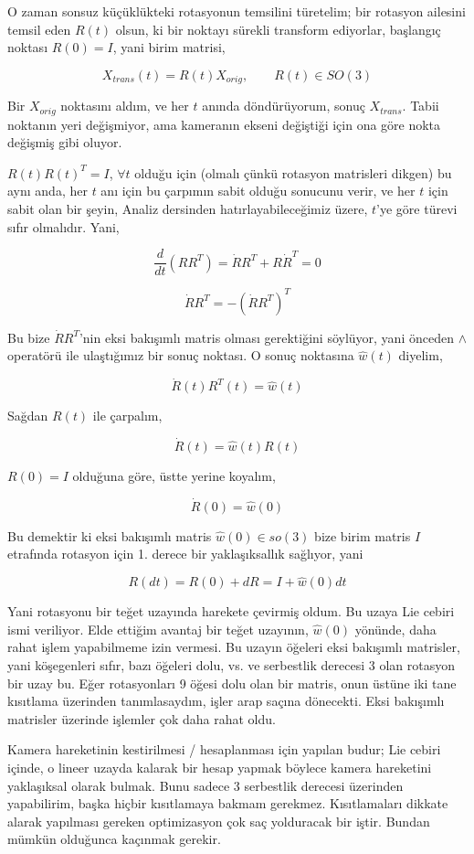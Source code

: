 \documentclass[12pt,fleqn]{article}\usepackage{../../common}
\begin{document}
O zaman sonsuz küçüklükteki rotasyonun temsilini türetelim; bir rotasyon
ailesini temsil eden $R(t)$ olsun, ki bir noktayı sürekli transform
ediyorlar, başlangıç noktası $R(0) = I$, yani birim matrisi,

$$ X_{trans}(t) = R(t) X_{orig}, \qquad R(t) \in SO(3) $$

Bir $X_{orig}$ noktasını aldım, ve her $t$ anında döndürüyorum, sonuç
$X_{trans}$. Tabii noktanın yeri değişmiyor, ama kameranın ekseni değiştiği
için ona göre nokta değişmiş gibi oluyor. 

$R(t)R(t)^T = I$, $\forall t$ olduğu için (olmalı çünkü rotasyon matrisleri
dikgen) bu aynı anda, her $t$ anı için bu çarpımın sabit olduğu sonucunu
verir, ve her $t$ için sabit olan bir şeyin, Analiz dersinden
hatırlayabileceğimiz üzere, $t$'ye göre türevi sıfır olmalıdır. Yani,

$$ \frac{d}{dt} (RR^T) = \dot{R}R^T + R \dot{R}^T = 0 $$

$$  \dot{R}R^T = - (\dot{R}R^T)^T  $$

Bu bize $\dot{R}R^T$'nin eksi bakışımlı matris olması gerektiğini söylüyor,
yani önceden $\land$ operatörü ile ulaştığımız bir sonuç noktası. O sonuç
noktasına $\hat{w}(t)$ diyelim,

$$\dot{R}(t)R^T(t) = \hat{w}(t)$$

Sağdan $R(t)$ ile çarpalım, 

$$\dot{R}(t) = \hat{w}(t)R(t)$$

$R(0)=I$ olduğuna göre, üstte yerine koyalım, 

$$\dot{R}(0) = \hat{w}(0)  $$

Bu demektir ki eksi bakışımlı matris $ \hat{w}(0) \in so(3)$ bize birim
matris $I$ etrafında rotasyon için 1. derece bir yaklaşıksallık sağlıyor,
yani 

$$ R(dt) = R(0) + dR = I +  \hat{w}(0) dt $$

Yani rotasyonu bir teğet uzayında harekete çevirmiş oldum. Bu uzaya Lie
cebiri ismi veriliyor. Elde ettiğim avantaj bir teğet uzayının,
$\hat{w}(0)$ yönünde, daha rahat işlem yapabilmeme izin vermesi. Bu uzayın
öğeleri eksi bakışımlı matrisler, yani köşegenleri sıfır, bazı öğeleri
dolu, vs. ve serbestlik derecesi 3 olan rotasyon bir uzay bu. Eğer
rotasyonları 9 öğesi dolu olan bir matris, onun üstüne iki tane kısıtlama
üzerinden tanımlasaydım, işler arap saçına dönecekti. Eksi bakışımlı
matrisler üzerinde işlemler çok daha rahat oldu.

Kamera hareketinin kestirilmesi / hesaplanması için yapılan budur; Lie
cebiri içinde, o lineer uzayda kalarak bir hesap yapmak böylece kamera
hareketini yaklaşıksal olarak bulmak. Bunu sadece 3 serbestlik derecesi
üzerinden yapabilirim, başka hiçbir kısıtlamaya bakmam
gerekmez. Kısıtlamaları dikkate alarak yapılması gereken optimizasyon çok
saç yolduracak bir iştir. Bundan mümkün olduğunca kaçınmak gerekir.
\end{document}
